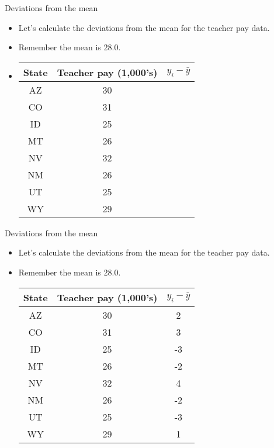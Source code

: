 \documentclass[xcolor=dvipsnames]{beamer}
\begin{document}
\begin{frame}{Deviations from the mean}
	\begin{itemize}
		\item Let's calculate the deviations from the mean for the teacher pay data.
		\item Remember the mean is 28.0.
		\item 
			\begin{center}
			\begin{tabular}{|c|c|c|}
				\hline 
				\textbf{State} & \textbf{Teacher pay (1,000's)} &  $y_i - \bar{y}$ \\ 
				\hline \hline
				AZ & 30 &\\ \hline 
				CO &  31 &\\ \hline 
				ID & 25  &\\  \hline 
				MT &  26 &\\ \hline 
				NV & 32 &\\ \hline 
				NM &  26 &\\ \hline 
				UT &  25 &\\ \hline 
				WY &  29 &\\ \hline 
			\end{tabular} 
		\end{center}
	\end{itemize}
\end{frame}

\begin{frame}{Deviations from the mean}
	\begin{itemize}
		\item Let's calculate the deviations from the mean for the teacher pay data.
		\item Remember the mean is 28.0.
\vspace{5 pt}
		\begin{center}
			\begin{tabular}{|c|c|c|}
				\hline 
				\textbf{State} & \textbf{Teacher pay (1,000's)} &  $y_i - \bar{y}$ \\ 
				\hline \hline
				AZ & 30 & 2\\ \hline 
				CO &  31 & 3\\ \hline 
				ID & 25  & -3\\  \hline 
				MT &  26 & -2\\ \hline 
				NV & 32 & 4\\ \hline 
				NM &  26 & -2\\ \hline 
				UT &  25 & -3\\ \hline 
				WY &  29 & 1\\ \hline 
			\end{tabular} 
		\end{center}
	\end{itemize}
\end{frame}
\end{document}
